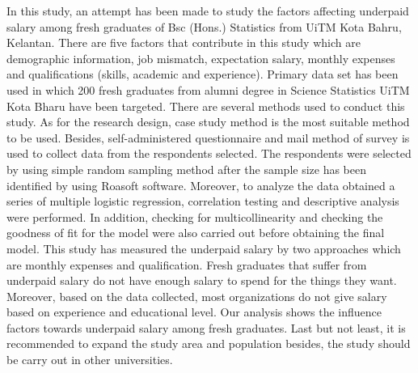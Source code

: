 In this study, an attempt has been made to study the factors affecting underpaid salary among fresh graduates of Bsc (Hons.) Statistics from UiTM Kota Bahru, Kelantan. There are five factors that contribute in this study which are demographic information, job mismatch, expectation salary, monthly expenses and qualifications (skills, academic and experience). Primary data set has been used in which 200 fresh graduates from alumni degree in Science Statistics UiTM Kota Bharu have been targeted. There are several methods used to conduct this study. As for the research design, case study method is the most suitable method to be used. Besides, self-administered questionnaire and mail method of survey is used to collect data from the respondents selected. The respondents were selected by using simple random sampling method after the sample size has been identified by using Roasoft software. Moreover, to analyze the data obtained a series of multiple logistic regression, correlation testing and descriptive analysis were performed. In addition, checking for multicollinearity and checking the goodness of fit for the model were also carried out before obtaining the final model. This study has measured the underpaid salary by two approaches which are monthly expenses and qualification. Fresh graduates that suffer from underpaid salary do not have enough salary to spend for the things they want. Moreover, based on the data collected, most organizations do not give salary based on experience and educational level. Our analysis shows the influence factors towards underpaid salary among fresh graduates. Last but not least, it is recommended to expand the study area and population besides, the study should be carry out in other universities.
\\


\renewcommand{\baselinestretch}{2.0} %
\mainmatter













\backmatter
%


\printglossary


